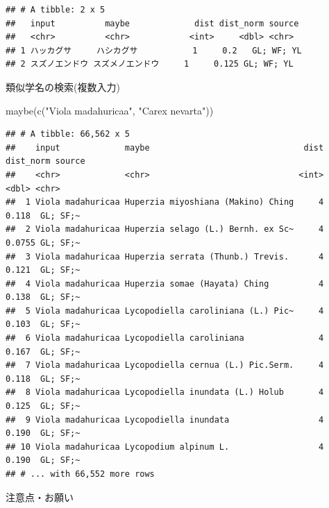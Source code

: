 \documentclass[
  a5paper,
  landscape,
  notitlepage]{report}
\newenvironment{Shaded}{\begin{snugshade}}{\end{snugshade}}
\newcommand{\FunctionTok}[1]{\textcolor[rgb]{0.00,0.00,0.00}{#1}}
\newcommand{\NormalTok}[1]{#1}
\newcommand{\StringTok}[1]{\textcolor[rgb]{0.31,0.60,0.02}{#1}}
\begin{document}
\begin{verbatim}
## # A tibble: 2 x 5
##   input          maybe             dist dist_norm source    
##   <chr>          <chr>            <int>     <dbl> <chr>     
## 1 ハッカグサ     ハシカグサ           1     0.2   GL; WF; YL
## 2 スズノエンドウ スズメノエンドウ     1     0.125 GL; WF; YL
\end{verbatim}

\newpage

\fontsize{32pt}{32pt}\selectfont

\begin{center}
類似学名の検索(複数入力)
\end{center}

\fontsize{14pt}{14pt}\selectfont

\begin{Shaded}
\begin{Highlighting}[]
\FunctionTok{maybe}\NormalTok{(}\FunctionTok{c}\NormalTok{(}\StringTok{"Viola madahuricaa"}\NormalTok{, }\StringTok{"Carex nevarta"}\NormalTok{))}
\end{Highlighting}
\end{Shaded}

\begin{verbatim}
## # A tibble: 66,562 x 5
##    input             maybe                               dist dist_norm source  
##    <chr>             <chr>                              <int>     <dbl> <chr>   
##  1 Viola madahuricaa Huperzia miyoshiana (Makino) Ching     4    0.118  GL; SF;~
##  2 Viola madahuricaa Huperzia selago (L.) Bernh. ex Sc~     4    0.0755 GL; SF;~
##  3 Viola madahuricaa Huperzia serrata (Thunb.) Trevis.      4    0.121  GL; SF;~
##  4 Viola madahuricaa Huperzia somae (Hayata) Ching          4    0.138  GL; SF;~
##  5 Viola madahuricaa Lycopodiella caroliniana (L.) Pic~     4    0.103  GL; SF;~
##  6 Viola madahuricaa Lycopodiella caroliniana               4    0.167  GL; SF;~
##  7 Viola madahuricaa Lycopodiella cernua (L.) Pic.Serm.     4    0.118  GL; SF;~
##  8 Viola madahuricaa Lycopodiella inundata (L.) Holub       4    0.125  GL; SF;~
##  9 Viola madahuricaa Lycopodiella inundata                  4    0.190  GL; SF;~
## 10 Viola madahuricaa Lycopodium alpinum L.                  4    0.190  GL; SF;~
## # ... with 66,552 more rows
\end{verbatim}

\newpage

\fontsize{32pt}{32pt}\selectfont

\begin{center}
注意点・お願い
\end{center}
\end{document}
